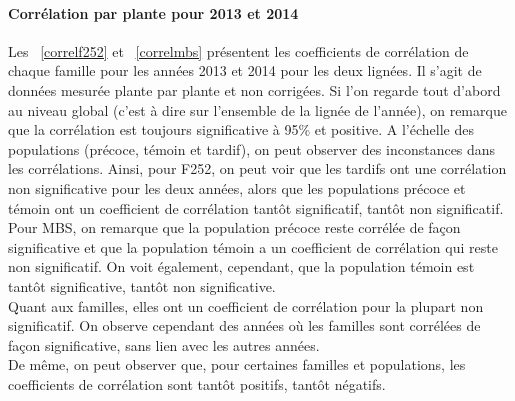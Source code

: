 \documentclass[12pt,a4paper]{article}
\begin{document}
			 			\paragraph{Corrélation par plante pour 2013 et 2014}
			 				
			 				Les ~\ref{correlf252} et ~\ref{correlmbs} présentent les coefficients de corrélation de chaque famille pour les années 2013 et 2014 pour les deux lignées. Il s'agit de données mesurée plante par plante et non corrigées.
			 				Si l'on regarde tout d'abord au niveau global (c'est à dire sur l'ensemble de la lignée de l'année), on remarque que la corrélation est toujours significative à 95\% et positive. A l'échelle des populations (précoce, témoin et tardif), on peut observer des inconstances dans les corrélations. Ainsi, pour F252, on peut voir que les tardifs ont une corrélation non significative pour les deux années, alors que les populations précoce et témoin ont un coefficient de corrélation tantôt significatif, tantôt non significatif. Pour MBS, on remarque que la population précoce reste corrélée de façon significative et que la population témoin a un coefficient de corrélation qui reste non significatif. On voit également, cependant, que la population témoin est tantôt significative, tantôt non significative.\\
			 				Quant aux familles, elles ont un coefficient de corrélation pour la plupart non significatif. On observe cependant des années où les familles sont corrélées de façon significative, sans lien avec les autres années.\\
			 				De même, on peut observer que, pour certaines familles et populations, les coefficients de corrélation sont tantôt positifs, tantôt négatifs.\\
			 				
\end{document}
